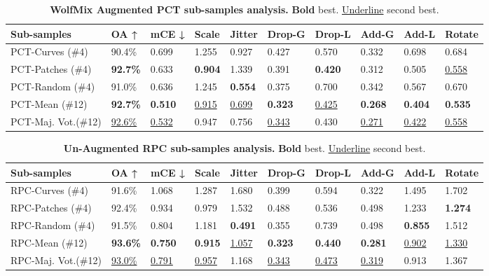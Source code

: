 \documentclass[10pt,twocolumn]{article}
\begin{document}
\begin{table*}
  \centering
    \begin{tabular}{p{4cm} || p{1.1cm} p{1.1cm} p{1.1cm} p{1.1cm} p{1.2cm} p{1.2cm} p{1.1cm} p{1.1cm} p{1.1cm}}
    \hline
    Sub-samples & OA ↑ & mCE ↓ & Scale & Jitter & Drop-G & Drop-L & Add-G & Add-L & Rotate \\
    \hline
    PCT-Curves (\#4) & 90.4\% & 0.699 & 1.255 & 0.927 & 0.427 & 0.570 & 0.332 & 0.698 & 0.684\\
    PCT-Patches (\#4) & \textbf{92.7\%} & 0.633 & \textbf{0.904} & 1.339 & 0.391 & \textbf{0.420} & 0.312 & 0.505 & \underline{0.558}\\
    PCT-Random (\#4) & 91.0\% & 0.636 & 1.245 & \textbf{0.554} & 0.375 & 0.700 & 0.342 & 0.567 & 0.670\\
    \hline
    PCT-Mean (\#12) & \textbf{92.7\%} & \textbf{0.510} & \underline{0.915} & \underline{0.699} & \textbf{0.323} &  \underline{0.425} & \textbf{0.268} & \textbf{0.404} &  \textbf{0.535}\\
    PCT-Maj. Vot.(\#12) & \underline{92.6\%} & \underline{0.532} & 0.947 & 0.756 & \underline{0.343} &  0.430 & \underline{0.271} & \underline{0.422} &  \underline{0.558}\\
    
    \hline
  \end{tabular}
  \caption{{\bf WolfMix Augmented PCT sub-samples analysis.} {\bf Bold} best. \underline{Underline} second best.}
  \label{table:pct_augmented_sub_samples}
\end{table*}

\begin{table*}
  \centering
    \begin{tabular}{p{4cm} || p{1.1cm} p{1.1cm} p{1.1cm} p{1.1cm} p{1.2cm} p{1.2cm} p{1.1cm} p{1.1cm} p{1.1cm}}
    \hline
    Sub-samples & OA ↑ & mCE ↓ & Scale & Jitter & Drop-G & Drop-L & Add-G & Add-L & Rotate \\
    \hline
    RPC-Curves (\#4) & 91.6\% & 1.068 & 1.287 & 1.680 & 0.399 & 0.594& 0.322 & 1.495 & 1.702\\
    RPC-Patches (\#4) & 92.4\% & 0.934 & 0.979 & 1.532 & 0.488 & 0.536 & 0.498 & 1.233 & \textbf{1.274}\\
    RPC-Random (\#4) & 91.5\% & 0.804 & 1.181 & \textbf{0.491} & 0.355 & 0.739 & 0.498 & \textbf{0.855} & 1.512\\
    \hline
    RPC-Mean (\#12) & \textbf{93.6\%} & \textbf{0.750} & \textbf{0.915} & \underline{1.057} & \textbf{0.323} &  \textbf{0.440} & \textbf{0.281} & \underline{0.902} &  \underline{1.330}\\
    RPC-Maj. Vot.(\#12) & \underline{93.0\%} & \underline{0.791} & \underline{0.957} & 1.168 & \underline{0.343} &  \underline{0.473} & \underline{0.319} & 0.913 &  1.367\\
    
    \hline
  \end{tabular}
  \caption{{\bf Un-Augmented RPC sub-samples analysis.} {\bf Bold} best. \underline{Underline} second best.}
  \label{table:rpc_unaugmented_sub_samples}
\end{table*}
\end{document}
